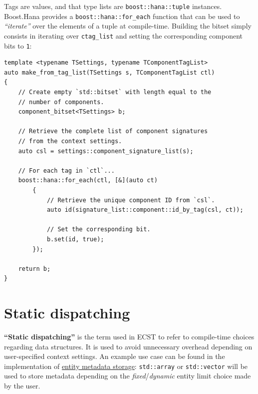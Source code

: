 \documentclass[twoside, 12pt, a4paper, openright]{book}
\begin{document}
Tags are values, and that type lists are
\texttt{boost::hana::tuple}
instances. Boost.Hana provides a
\texttt{boost::hana::for_each}
function that can be used to \emph{``iterate''} over the elements of a
tuple at compile-time. Building the bitset simply consists in iterating
over
\texttt{ctag_list}
and setting the corresponding component bits to
\texttt{1}:

\begin{verbatim}
template <typename TSettings, typename TComponentTagList>
auto make_from_tag_list(TSettings s, TComponentTagList ctl)
{
    // Create empty `std::bitset` with length equal to the
    // number of components.
    component_bitset<TSettings> b;

    // Retrieve the complete list of component signatures
    // from the context settings.
    auto csl = settings::component_signature_list(s);

    // For each tag in `ctl`...
    boost::hana::for_each(ctl, [&](auto ct)
        {
            // Retrieve the unique component ID from `csl`.
            auto id(signature_list::component::id_by_tag(csl, ct));

            // Set the corresponding bit.
            b.set(id, true);
        });

    return b;
}
\end{verbatim}

\hypertarget{appendix_static_dispatching}{\section{Static
dispatching}\label{appendix_static_dispatching}}

\textbf{``Static dispatching''} is the term used in ECST to refer to
compile-time choices regarding data structures. It is used to avoid
unnecessary overhead depending on user-specified context settings. An
example use case can be found in the implementation of
\protect\hyperlink{storage_entity}{entity metadata storage}:
\texttt{std::array}
or
\texttt{std::vector}
will be used to store metadata depending on the
\emph{fixed}/\emph{dynamic} entity limit choice made by the user.
\end{document}
